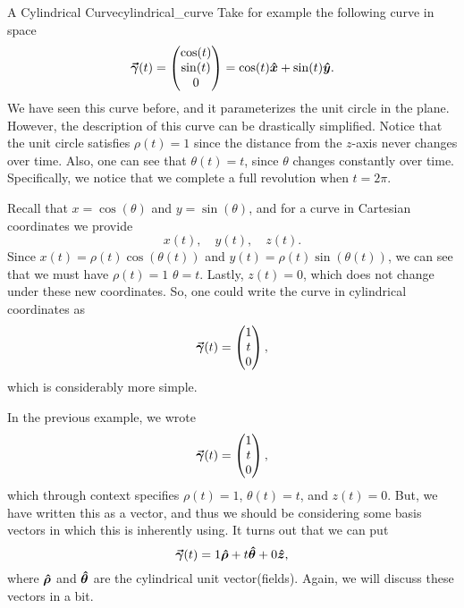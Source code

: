 \begin{ex}{A Cylindrical Curve}{cylindrical_curve}
    Take for example the following curve in space
    \[
    \boldsymbol{\vec{\gamma}}(t) = \begin{pmatrix} \cos(t) \\ \sin(t) \\ 0 \end{pmatrix} = \cos(t)\boldsymbol{\hat{x}} + \sin(t)\boldsymbol{\hat{y}}.
    \]
    We have seen this curve before, and it parameterizes the unit circle in the plane.  However, the description of this curve can be drastically simplified.  Notice that the unit circle satisfies $\rho(t)=1$ since the distance from the $z$-axis never changes over time.  Also, one can see that $\theta(t)=t$, since $\theta$ changes constantly over time.  Specifically, we notice that we complete a full revolution when $t=2\pi$.
    
    Recall that $x=\cos(\theta)$ and $y=\sin(\theta)$, and for a curve in Cartesian coordinates we provide
    \[
    x(t), \quad y(t), \quad z(t).
    \]
    Since $x(t)=\rho(t)\cos(\theta(t))$ and $y(t)=\rho(t)\sin(\theta(t))$, we can see that we must have $\rho(t)=1$ $\theta=t$. Lastly, $z(t)=0$, which does not change under these new coordinates.  So, one could write the curve in cylindrical coordinates as
    \[
    \boldsymbol{\vec{\gamma}}(t) = \begin{pmatrix} 1 \\ t \\ 0 \end{pmatrix},
    \]
    which is considerably more simple.  
\end{ex}

In the previous example, we wrote
\[
\boldsymbol{\vec{\gamma}}(t) = \begin{pmatrix} 1 \\ t \\ 0 \end{pmatrix},
\]
which through context specifies $\rho(t)=1$, $\theta(t)=t$, and $z(t)=0$.  But, we have written this as a vector, and thus we should be considering some basis vectors in which this is inherently using.  It turns out that we can put
\[
\boldsymbol{\vec{\gamma}}(t) = 1\boldsymbol{\hat{\rho}} + t \boldsymbol{\hat{\theta}} + 0\boldsymbol{\hat{z}},
\]
where $\boldsymbol{\hat{\rho}}$ and $\boldsymbol{\hat{\theta}}$ are the cylindrical unit vector(fields).  Again, we will discuss these vectors in a bit.

